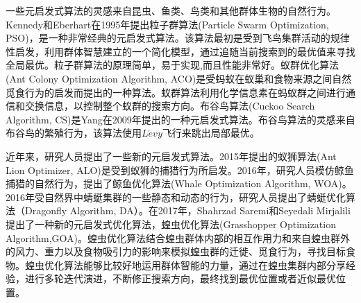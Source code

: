 一些元启发式算法的灵感来自昆虫、鱼类、鸟类和其他群体生物的自然行为。Kennedy和Eberhart在1995年提出粒子群算法(Particle Swarm Optimization, PSO)，是一种非常经典的元启发式算法\cite{kennedy1995particle,liao2007discrete,krishnasamy2013task}。该算法最初是受到飞鸟集群活动的规律性启发，利用群体智慧建立的一个简化模型，通过追随当前搜索到的最优值来寻找全局最优。粒子群算法的原理简单，易于实现,而且性能非常好。蚁群优化算法(Ant Colony Optimization Algorithm, ACO)是受蚂蚁在蚁巢和食物来源之间自然觅食行为的启发而提出的一种算法\cite{dorigo1997ant,dorigo1999ant,郝航2018基于并行化蚁群算法的网络测量节点选取算法}。蚁群算法利用化学信息素在蚂蚁群之间进行通信和交换信息，以控制整个蚁群的搜索方向。布谷鸟算法(Cuckoo Search Algorithm, CS)是Yang在2009年提出的一种元启发式算法\cite{yang2009cuckoo}。布谷鸟算法的灵感来自布谷鸟的繁殖行为，该算法使用$L\acute{e}vy$飞行来跳出局部最优。

近年来，研究人员提出了一些新的元启发式算法。2015年提出的蚁狮算法(Ant Lion Optimizer, ALO)是受到蚁狮的捕猎行为所启发\cite{mirjalili2015ant}。2016年，研究人员模仿鲸鱼捕猎的自然行为，提出了鲸鱼优化算法(Whale Optimization Algorithm, WOA)\cite{mirjalili2016whale,hu2016whale}。2016年受自然界中蜻蜓集群的一些静态和动态的行为，研究人员提出了蜻蜓优化算法（Dragonfly Algorithm, DA）\cite{mirjalili2016dragonfly,abdel2017solving,ks2017memory,song2017elite}。在2017年，Shahrzad Saremi和Seyedali Mirjalili提出了一种新的元启发式优化算法，蝗虫优化算法(Grasshopper Optimization Algorithm,GOA)\cite{saremi2017grasshopper}。蝗虫优化算法结合蝗虫群体内部的相互作用力和来自蝗虫群外的风力、重力以及食物吸引力的影响来模拟蝗虫群的迁徙、觅食行为，寻找目标食物。蝗虫优化算法能够比较好地运用群体智能的力量，通过在蝗虫集群内部分享经验，进行多轮迭代演进，不断修正搜索方向，最终找到最优位置或者近似最优位置。


